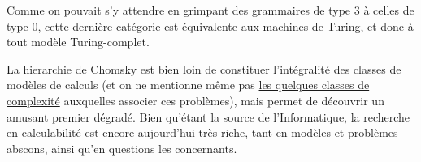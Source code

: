 Comme on pouvait s'y attendre en grimpant des grammaires de type 3 à celles de type 0, cette dernière catégorie est équivalente aux machines de Turing, et donc à tout modèle Turing-complet. 

La hierarchie de Chomsky est bien loin de constituer l'intégralité des classes de modèles de calculs (et on ne mentionne même pas \href{https://www.math.ucdavis.edu/~greg/zoology/diagram.pdf}{les quelques classes de complexité} auxquelles associer ces problèmes), mais permet de découvrir un amusant premier dégradé. Bien qu'étant la source de l'Informatique, la recherche en calculabilité est encore aujourd'hui très riche, tant en modèles et problèmes abscons, ainsi qu'en questions les concernants.